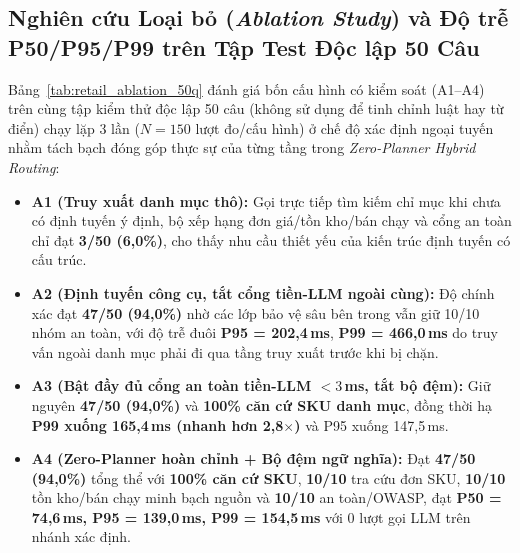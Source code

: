 \subsection*{Nghiên cứu Loại bỏ (\emph{Ablation Study}) và Độ trễ P50/P95/P99 trên Tập Test Độc lập 50 Câu}
Bảng~\ref{tab:retail_ablation_50q} đánh giá bốn cấu hình có kiểm soát (A1--A4) trên cùng tập kiểm thử độc lập 50 câu (không sử dụng để tinh chỉnh luật hay từ điển) chạy lặp 3 lần ($N=150$ lượt đo/cấu hình) ở chế độ xác định ngoại tuyến nhằm tách bạch đóng góp thực sự của từng tầng trong \emph{Zero-Planner Hybrid Routing}:
\begin{itemize}
    \item \textbf{A1 (Truy xuất danh mục thô):} Gọi trực tiếp tìm kiếm chỉ mục khi chưa có định tuyến ý định, bộ xếp hạng đơn giá/tồn kho/bán chạy và cổng an toàn chỉ đạt \textbf{3/50 (6,0\%)}, cho thấy nhu cầu thiết yếu của kiến trúc định tuyến có cấu trúc.
    \item \textbf{A2 (Định tuyến công cụ, tắt cổng tiền-LLM ngoài cùng):} Độ chính xác đạt \textbf{47/50 (94,0\%)} nhờ các lớp bảo vệ sâu bên trong vẫn giữ 10/10 nhóm an toàn, với độ trễ đuôi \textbf{P95 = 202,4\,ms}, \textbf{P99 = 466,0\,ms} do truy vấn ngoài danh mục phải đi qua tầng truy xuất trước khi bị chặn.
    \item \textbf{A3 (Bật đầy đủ cổng an toàn tiền-LLM $<3$\,ms, tắt bộ đệm):} Giữ nguyên \textbf{47/50 (94,0\%)} và \textbf{100\% căn cứ SKU danh mục}, đồng thời hạ \textbf{P99 xuống 165,4\,ms (nhanh hơn 2,8$\times$)} và P95 xuống 147,5\,ms.
    \item \textbf{A4 (Zero-Planner hoàn chỉnh + Bộ đệm ngữ nghĩa):} Đạt \textbf{47/50 (94,0\%)} tổng thể với \textbf{100\% căn cứ SKU}, \textbf{10/10} tra cứu đơn SKU, \textbf{10/10} tồn kho/bán chạy minh bạch nguồn và \textbf{10/10} an toàn/OWASP, đạt \textbf{P50 = 74,6\,ms, P95 = 139,0\,ms, P99 = 154,5\,ms} với 0 lượt gọi LLM trên nhánh xác định.
\end{itemize}

